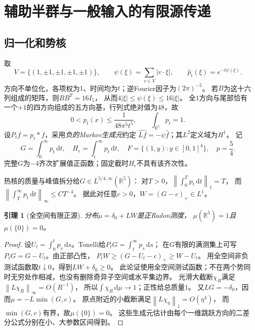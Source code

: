 \documentclass[UTF8,fontset=fandol,zihao=-4,a4paper]{ctexart}
\newtheorem{lemma}[theorem]{引理}
\newcommand{\R}{\mathbb R}
\newcommand{\1}{\mathbf 1}
\newcommand{\dd}{\,\mathrm d}
\newcommand{\norm}[1]{\left\lVert#1\right\rVert}
\begin{document}
\section{辅助半群与一般输入的有限源传递}
\subsection{归一化和势核}
取
\[
 V=\{(1,\pm1,\pm1,\pm1,\pm1)\},\qquad
 \psi(\xi)=\sum_{v\in V}|v\cdot\xi|,\qquad
 \widehat p_t(\xi)=e^{-t\psi(\xi)}.
\]
方向不单位化，各项权为$1$、时间均为$t$；逆Fourier因子为$(2\pi)^{-5}$。
若$B$为这十六列组成的矩阵，则$BB^{T}=16I_5$，
从而$4|\xi|\le\psi(\xi)\le16|\xi|$。
全$1$方向与尾部恰有一个$+1$的四方向组成的五方向基，行列式绝对值为$48$，故
\[
 0<p_t(x)\le\frac1{48\pi^5t^5},\qquad \int_{\R^5}p_t=1.
\]
设$P_t f=p_t*f$，采用\emph{负的Markov生成元}约定
$\widehat{Lf}=-\psi\widehat f$；其$L^2$定义域为$H^1$。
记
\[
 G=\int_0^\infty p_t\dd t,\quad
 H_\epsilon=\int_\epsilon^\infty p_t\dd t,\quad
 F=\{(1,y):y\in[0,1]^4\},\quad p=\frac54.
\]
完整$G$为$-4$齐次扩展值正函数；固定截时$H_\epsilon$不具有该齐次性。

热核的质量与峰值拆分给$G\in L^{5/4,\infty}(\R^5)$：
对$T>0$，$\norm{\int_0^Tp_t\dd t}_1=T$，
而$\norm{\int_T^\infty p_t\dd t}_\infty\le C T^{-4}$。
据此对任意$c>0$，$W=(G-c)_+\in L^1$。

\begin{lemma}[全空间有限正源]\label{lem:source}
分布$\mu=\delta_0+LW$是正Radon测度，
$\mu(\R^5)=1$且$\mu(\{0\})=0$。
\end{lemma}
\begin{proof}
设$U_t=\int_0^tp_s\dd s$。Tonelli给$P_tG=\int_t^\infty p_s\dd s$；
在$G$有限的满测集上可写$P_tG=G-U_t$。由正部凸性，
$P_tW\ge(G-U_t-c)_+\ge W-U_t$。
用全空间非负测试函数取$t\downarrow0$，得到$LW+\delta_0\ge0$。
此论证使用全空间测试函数；不在两个势同时无穷处作相减，也没有删除奇异子空间或水平集边界。
光滑大截断$\chi_R$满足$\norm{L\chi_R}_\infty=O(R^{-1})$，
所以$\int\chi_R\dd\mu\to1$；正性给总质量$1$。
又$LG=-\delta_0$，因而$\mu=-L\min(G,c)$。
原点附近的小截断满足$\norm{L\chi_\eta}_1=O(\eta^4)$，
而$\min(G,c)$有界，故$\mu(\{0\})=0$。
这些生成元估计由每个一维跳跃方向的二差分公式分别在小、大参数区间得到。
\end{proof}
\end{document}
